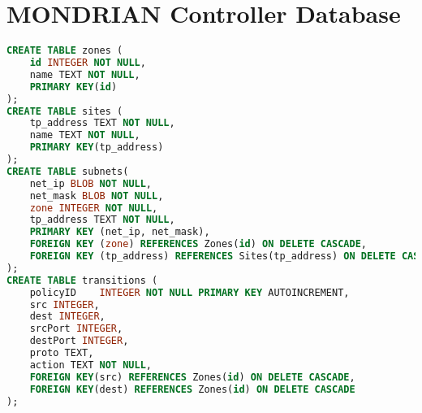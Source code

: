 \chapter{MONDRIAN Controller Database}
%
%

\begin{lstlisting}[language=SQL, breaklines=True, caption=MONDRIAN Controller Database, label=MONDRIAN Controller Database, sensitive=true]
CREATE TABLE zones (
	id INTEGER NOT NULL,
	name TEXT NOT NULL,
	PRIMARY KEY(id)
);
CREATE TABLE sites (
	tp_address TEXT NOT NULL,
	name TEXT NOT NULL,
	PRIMARY KEY(tp_address)
);
CREATE TABLE subnets(
	net_ip BLOB NOT NULL,
	net_mask BLOB NOT NULL,
	zone INTEGER NOT NULL,
	tp_address TEXT NOT NULL,
	PRIMARY KEY (net_ip, net_mask),
	FOREIGN KEY (zone) REFERENCES Zones(id) ON DELETE CASCADE,
	FOREIGN KEY (tp_address) REFERENCES Sites(tp_address) ON DELETE CASCADE
);	  
CREATE TABLE transitions (
	policyID	INTEGER NOT NULL PRIMARY KEY AUTOINCREMENT,
	src INTEGER,
	dest INTEGER,
	srcPort INTEGER,
	destPort INTEGER,
	proto TEXT,
	action TEXT NOT NULL,
	FOREIGN KEY(src) REFERENCES Zones(id) ON DELETE CASCADE,
	FOREIGN KEY(dest) REFERENCES Zones(id) ON DELETE CASCADE
);
\end{lstlisting}

